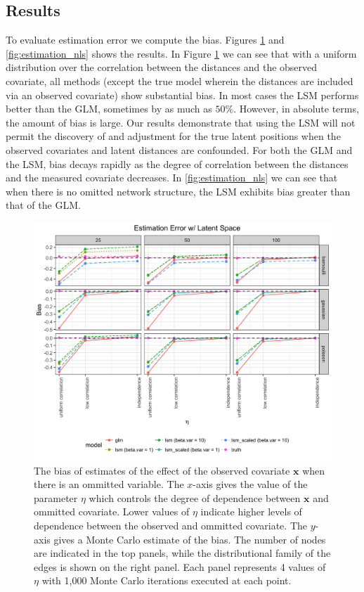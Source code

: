\documentclass[11pt]{article}
\begin{document}
\subsection{Results}

To evaluate estimation error we compute the bias. Figures
\ref{fig:estimation_ls} and \ref{fig:estimation_nls} shows the
results. In Figure \ref{fig:estimation_ls} we can see that with a
uniform distribution over the correlation between the distances and
the observed covariate, all methods (except the true model wherein the
distances are included via an observed covariate) show substantial
bias. In most cases the LSM performs better than the GLM, sometimes by
as much as $50\%$. However, in absolute terms, the amount of bias is
large. Our results demonstrate that using the LSM will not permit the
discovery of and adjustment for the true latent positions when the
observed covariates and latent distances are confounded.  For both the
GLM and the LSM, bias decays rapidly as the degree of correlation
between the distances and the measured covariate decreases. In
\ref{fig:estimation_nls} we can see that when there is no omitted
network structure, the LSM exhibits bias greater than that of the GLM.

\begin{figure}
\includegraphics[width=\textwidth]{figures/estimation_ls.png}
\caption{The bias of estimates of the effect of the observed covariate $\mathbf{x}$ when there is an ommitted variable. The $x$-axis gives the value of the parameter $\eta$ which controls the degree of dependence between $\mathbf{x}$ and ommitted covariate. Lower values of $\eta$ indicate higher levels of dependence between the observed and ommitted covariate. The $y$-axis gives a Monte Carlo estimate of the bias. The number of nodes are indicated in the top panels, while the distributional family of the edges is shown on the right panel. Each panel represents 4 values of $\eta$ with 1,000 Monte Carlo iterations executed at each point.
\label{fig:estimation_ls}}
\end{figure}
\end{document}

